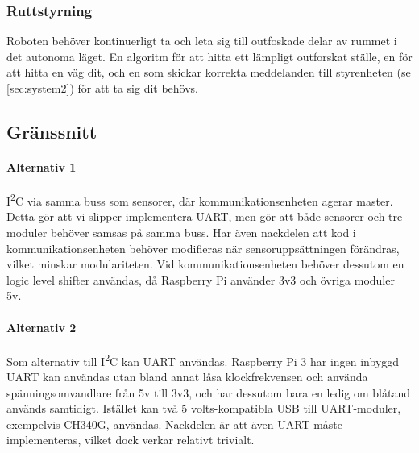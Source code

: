 \documentclass[a4paper,11pt]{article}
\begin{document}
\subsubsection{Ruttstyrning}
Roboten behöver kontinuerligt ta och leta sig till outfoskade delar av rummet i det autonoma läget. En algoritm för att hitta ett lämpligt outforskat ställe, en för att hitta en väg dit, och en som skickar korrekta meddelanden till styrenheten (se \ref{sec:system2}) för att ta sig dit behövs.

\subsection{Gränssnitt} \label{ssec:brainInterface}

\paragraph{Alternativ 1}
I\textsuperscript{2}C via samma buss som sensorer, där kommunikationsenheten agerar master. Detta gör att vi slipper implementera UART, men gör att både sensorer och tre moduler behöver samsas på samma buss. Har även nackdelen att kod i kommunikationsenheten behöver modifieras när sensoruppsättningen förändras, vilket minskar modulariteten. %
Vid kommunikationsenheten behöver dessutom en logic level shifter användas, då Raspberry Pi använder 3v3 och övriga moduler 5v.

\paragraph{Alternativ 2}
Som alternativ till I\textsuperscript{2}C kan UART användas. Raspberry Pi 3 har ingen inbyggd UART kan användas utan bland annat låsa klockfrekvensen och använda spänningsomvandlare från 5v till 3v3, och har dessutom bara en ledig om blåtand används samtidigt. Istället kan två 5 volts-kompatibla USB till UART-moduler, exempelvis CH340G, användas. Nackdelen är att även UART måste implementeras, vilket dock verkar relativt trivialt. %

\newpage
\end{document}
